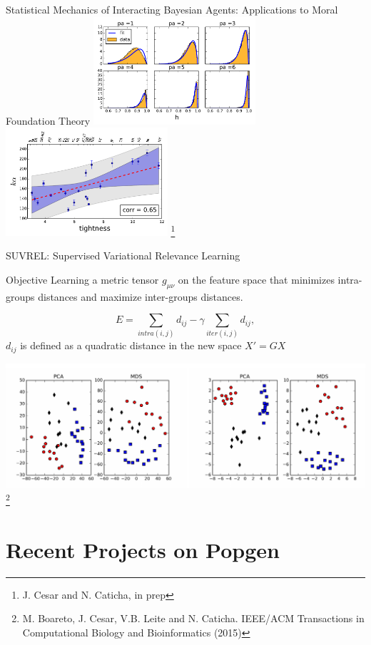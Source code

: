 \documentclass[10pt]{beamer}
\begin{document}
\begin{frame}{\normalsize Statistical Mechanics of Interacting Bayesian Agents: Applications
    to Moral Foundation Theory}
  \includegraphics[width=0.45\textwidth]{./Figures/mf_usa}
  \hspace{5pt}
  \includegraphics[width=0.45\textwidth]{./Figures/beta_tight.pdf}
  \let\thefootnote\relax\footnote{\tiny J. Cesar and N. Caticha, in prep}
\end{frame}

\begin{frame}{SUVREL: Supervised Variational Relevance Learning}

  \begin{alertblock}{Objective}
  Learning a metric tensor $g_{\mu\nu}$ on the feature space that minimizes
  intra-groups distances and maximize inter-groups distances. 
	\end{alertblock}
  \[
    E = \sum_{intra(i,j)} d_{ij} - \gamma \sum_{iter(i,j)} d_{ij}, 
  \]
  $d_{ij}$ is defined as a quadratic distance in the new space $X' = G X$ 

  \includegraphics[width=\textwidth]{./Figures/suvrel_image.png}
  \let\thefootnote\relax\footnote{M. Boareto, J. Cesar, V.B. Leite and
    N. Caticha. IEEE/ACM Transactions in Computational Biology and
    Bioinformatics (2015)}
\end{frame}

\section{Recent Projects on Popgen}
\end{document}
